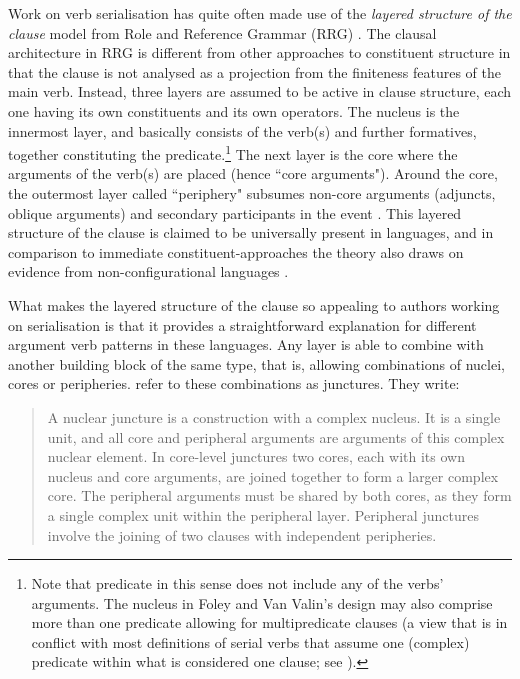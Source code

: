 Work on verb serialisation has quite often made use of the \textit{layered structure of the clause} model from Role and Reference Grammar (RRG) \citep{olson1981barai, foley1984functional, van1997syntax}. The clausal architecture in RRG is different from other approaches to constituent structure in that the clause is not analysed as a projection from the finiteness features of the main verb. Instead, three layers are assumed to be active in clause structure, each one having its own constituents and its own operators. The nucleus is the innermost layer, and basically consists of the verb(s) and further formatives, together constituting the predicate.\footnote{Note that predicate in this sense does not include any of the verbs' arguments. The nucleus in Foley and Van Valin's design may also comprise more than one predicate allowing for multipredicate clauses (a view that is in conflict with most definitions of serial verbs that assume one (complex) predicate within what is considered one clause; see \citealt[77]{foley1984functional}).} The next layer is the core where the arguments of the verb(s) are placed (hence ``core arguments"). Around the core, the outermost layer called ``periphery" subsumes non-core arguments (adjuncts, oblique arguments) and secondary participants in the event \citep[77]{foley1984functional}. This layered structure of the clause is claimed to be universally present in languages, and in comparison to immediate constituent-approaches the theory also draws on evidence from non-configurational languages \citep[78]{foley1984functional}.

What makes the layered structure of the clause so appealing to authors working on serialisation is that it provides a straightforward explanation for different argument verb patterns in these languages. Any layer is able to combine with another building block of the same type, that is, allowing combinations of nuclei, cores or peripheries. \citet[188]{foley1984functional} refer to these combinations as junctures. They write:

\begin{quote}A nuclear juncture is a construction with a complex nucleus. It is a single unit, and all core and peripheral arguments are arguments of this complex nuclear element. In core-level junctures two cores, each with its own nucleus and core arguments, are joined together to form a larger complex core. The peripheral arguments must be shared by both cores, as they form a single complex unit within the peripheral layer. Peripheral junctures involve the joining of two clauses with independent peripheries.\end{quote}

